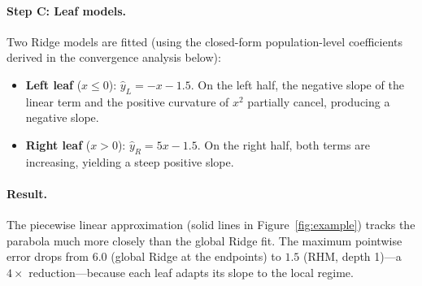\documentclass[11pt,a4paper]{article}
\begin{document}
\paragraph{Step C: Leaf models.} Two Ridge models are fitted (using the closed-form population-level coefficients derived in the convergence analysis below):
\begin{itemize}
    \item \textbf{Left leaf} ($x \leq 0$): $\hat{y}_L = -x - 1.5$. On the left half, the negative slope of the linear term and the positive curvature of $x^2$ partially cancel, producing a negative slope.
    \item \textbf{Right leaf} ($x > 0$): $\hat{y}_R = 5x - 1.5$. On the right half, both terms are increasing, yielding a steep positive slope.
\end{itemize}

\paragraph{Result.} The piecewise linear approximation (solid lines in Figure~\ref{fig:example}) tracks the parabola much more closely than the global Ridge fit. The maximum pointwise error drops from $6.0$ (global Ridge at the endpoints) to $1.5$ (RHM, depth 1)---a $4\times$ reduction---because each leaf adapts its slope to the local regime.
\end{document}

